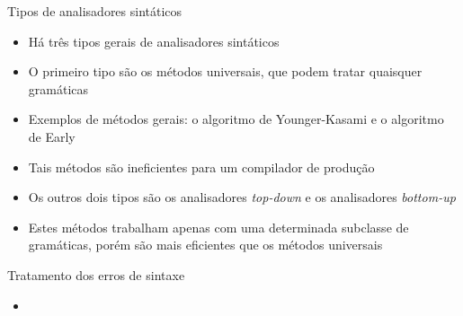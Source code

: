 \begin{frame}[fragile]{Tipos de analisadores sintáticos}

    \begin{itemize}
        \item Há três tipos gerais de analisadores sintáticos
        \pause

        \item O primeiro tipo são os métodos universais, que podem tratar quaisquer gramáticas
        \pause

        \item Exemplos de métodos gerais: o algoritmo de Younger-Kasami e o algoritmo de Early
        \pause

        \item Tais métodos são ineficientes para um compilador de produção
        \pause

        \item Os outros dois tipos são os analisadores \textit{top-down} e os analisadores \textit{bottom-up}
        \pause

        \item Estes métodos trabalham apenas com uma determinada subclasse de gramáticas, porém são mais eficientes que os métodos universais
    \end{itemize}

\end{frame}

\begin{frame}[fragile]{Tratamento dos erros de sintaxe}

    \begin{itemize}
        \item 
    \end{itemize}

\end{frame}

